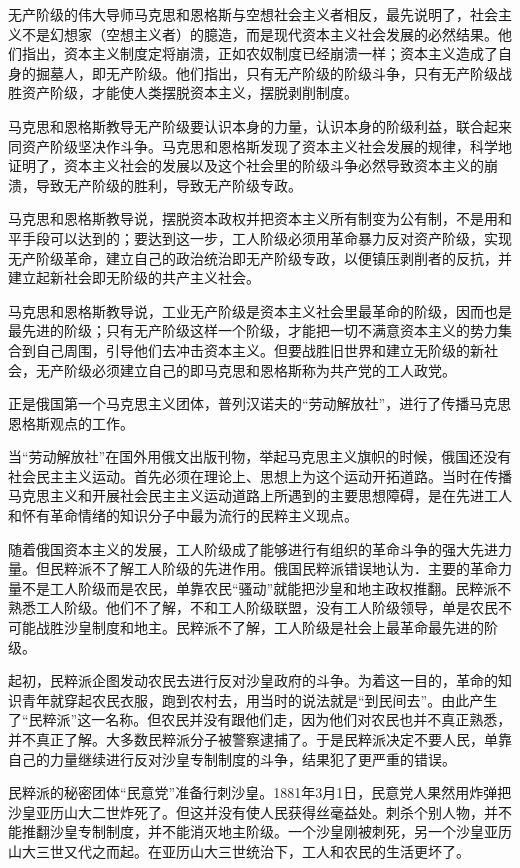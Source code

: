 无产阶级的伟大导师马克思和恩格斯与空想社会主义者相反，最先说明了，社会主义不是幻想家（空想主义者）的臆造，而是现代资本主义社会发展的必然结果。他们指出，资本主义制度定将崩溃，正如农奴制度已经崩溃一样；资本主义造成了自身的掘墓人，即无产阶级。他们指出，只有无产阶级的阶级斗争，只有无产阶级战胜资产阶级，才能使人类摆脱资本主义，摆脱剥削制度。

马克思和恩格斯教导无产阶级要认识本身的力量，认识本身的阶级利益，联合起来同资产阶级坚决作斗争。马克思和恩格斯发现了资本主义社会发展的规律，科学地证明了，资本主义社会的发展以及这个社会里的阶级斗争必然导致资本主义的崩溃，导致无产阶级的胜利，导致无产阶级专政。

马克思和恩格斯教导说，摆脱资本政权并把资本主义所有制变为公有制，不是用和平手段可以达到的；要达到这一步，工人阶级必须用革命暴力反对资产阶级，实现无产阶级革命，建立自己的政治统治即无产阶级专政，以便镇压剥削者的反抗，并建立起新社会即无阶级的共产主义社会。

马克思和恩格斯教导说，工业无产阶级是资本主义社会里最革命的阶级，因而也是最先进的阶级；只有无产阶级这样一个阶级，才能把一切不满意资本主义的势力集合到自己周围，引导他们去冲击资本主义。但要战胜旧世界和建立无阶级的新社会，无产阶级必须建立自己的即马克思和恩格斯称为共产党的工人政党。

正是俄国第一个马克思主义团体，普列汉诺夫的“劳动解放社”，进行了传播马克思恩格斯观点的工作。

当“劳动解放社”在国外用俄文出版刊物，举起马克思主义旗帜的时候，俄国还没有社会民主主义运动。首先必须在理论上、思想上为这个运动开拓道路。当时在传播马克思主义和开展社会民主主义运动道路上所遇到的主要思想障碍，是在先进工人和怀有革命情绪的知识分子中最为流行的民粹主义现点。

随着俄国资本主义的发展，工人阶级成了能够进行有组织的革命斗争的强大先进力量。但民粹派不了解工人阶级的先进作用。俄国民粹派错误地认为．主要的革命力量不是工人阶级而是农民，单靠农民“骚动”就能把沙皇和地主政权推翻。民粹派不熟悉工人阶级。他们不了解，不和工人阶级联盟，没有工人阶级领导，单是农民不可能战胜沙皇制度和地主。民粹派不了解，工人阶级是社会上最革命最先进的阶级。

起初，民粹派企图发动农民去进行反对沙皇政府的斗争。为着这一目的，革命的知识青年就穿起农民衣服，跑到农村去，用当时的说法就是“到民间去”。由此产生了“民粹派”这一名称。但农民并没有跟他们走，因为他们对农民也并不真正熟悉，并不真正了解。大多数民粹派分子被警察逮捕了。于是民粹派决定不要人民，单靠自己的力量继续进行反对沙皇专制制度的斗争，结果犯了更严重的错误。

民粹派的秘密团体“民意党”准备行刺沙皇。1881年3月1日，民意党人果然用炸弹把沙皇亚历山大二世炸死了。但这并没有使人民获得丝毫益处。刺杀个别人物，并不能推翻沙皇专制制度，并不能消灭地主阶级。一个沙皇刚被刺死，另一个沙皇亚历山大三世又代之而起。在亚历山大三世统治下，工人和农民的生活更坏了。

